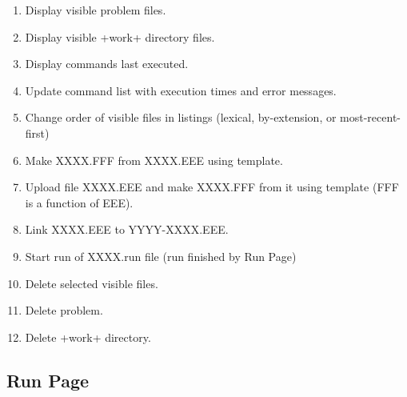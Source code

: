 \documentclass[12pt]{article}
\begin{document}
\begin{enumerate}
\item Display visible problem files.
\item Display visible +work+ directory files.
\item Display commands last executed.
\item Update command list with execution times and
      error messages.
\item Change order of visible files in listings (lexical,
      by-extension, or most-recent-first)
\item Make XXXX.FFF from XXXX.EEE using template.
\item Upload file XXXX.EEE and make XXXX.FFF from it using template
      (FFF is a function of EEE).
\item Link XXXX.EEE to YYYY-XXXX.EEE.
\item Start run of XXXX.run file (run finished by Run Page)
\item Delete selected visible files.
\item Delete problem.
\item Delete +work+ directory.
\end{enumerate}

\newpage

\subsection{Run Page}
\end{document}
